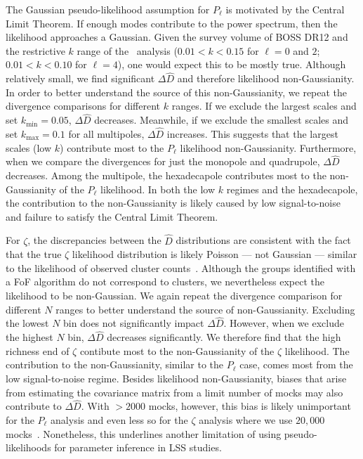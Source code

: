 \documentclass[12pt, letterpaper, preprint]{aastex}
\newcommand{\Beut}{\citetalias{beutler2017}\xspace}
\newcommand{\ms}[1]{{\color{orange}{\bf MS:}} {[\em #1}]}
\newcommand{\lss}{{\small{LSS}}\xspace}
\begin{document}
The Gaussian pseudo-likelihood assumption for $P_\ell$ is motivated 
by the Central Limit Theorem. If enough modes contribute to the 
power spectrum, then the likelihood approaches a Gaussian. Given the 
survey volume of BOSS DR12 and the restrictive $k$ range of the \Beut~analysis 
($0.01 < k < 0.15$ for $\ell = 0$ and $2$; $0.01 < k < 0.10$ for $\ell = 4$), 
one would expect this to be mostly true. Although relatively small, we
find significant $\Delta \widehat{D}$ and therefore likelihood non-Gaussianity. 
In order to better understand the source of this non-Gaussianity, 
we repeat the divergence comparisons for different $k$ ranges. If we 
exclude the largest scales and set $k_\mathrm{min} = 0.05$, $\Delta \widehat{D}$ 
decreases. Meanwhile, if we exclude the smallest scales and set 
$k_\mathrm{max} = 0.1$ for all 
multipoles, $\Delta \widehat{D}$ increases. This suggests that the largest 
scales (low $k$) contribute most to the $P_\ell$ likelihood non-Gaussianity.
Furthermore, when we compare the divergences for just the monopole and quadrupole, 
$\Delta \widehat{D}$ decreases. Among the multipole, the hexadecapole 
contributes most to the non-Gaussianity of the $P_\ell$ likelihood. 
In both the low $k$ regimes and the hexadecapole, the contribution to 
the non-Gaussianity is likely caused by low signal-to-noise and failure to 
satisfy the Central Limit Theorem.

For $\zeta$, the discrepancies between the $\widehat{D}$ distributions 
are consistent with the fact that the true $\zeta$ likelihood 
distribution is likely Poisson --- not Gaussian --- similar to the likelihood 
of observed cluster counts~\citep{cash1979,planckcollaboration2014,ade2016}. 
Although the groups identified with a FoF algorithm do not correspond
to clusters, we nevertheless expect the likelihood to be non-Gaussian. 
We again repeat the divergence comparison for different $N$ ranges 
to better understand the source of non-Gaussianity. Excluding the 
lowest $N$ bin does not significantly impact $\Delta \widehat{D}$. However, 
when we exclude the highest $N$ bin, $\Delta \widehat{D}$ decreases significantly. 
We therefore find that the high richness end of $\zeta$ contibute most to 
the non-Gaussianity of the $\zeta$ likelihood. The contribution to the 
non-Gaussianity, similar to the $P_\ell$ case, comes most from the low 
signal-to-noise regime. %
Besides likelihood non-Gaussianity, biases that arise from estimating
the covariance matrix from a limit number of mocks may also contribute 
to $\Delta \widehat{D}$. With $ > 2000$ mocks, however, this bias is 
likely unimportant for the $P_\ell$ analysis and even less so for the 
$\zeta$ analysis where we use $20,000$ mocks~\citep{hartlap2009}. Nonetheless, 
this underlines another limitation of using pseudo-likelihoods for 
parameter inference in \lss studies. 
\end{document}
